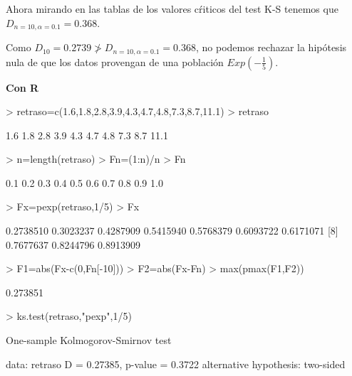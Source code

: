 \documentclass[10pt]{article}
\begin{document}
{Ahora mirando en las tablas de los valores cŕiticos del test K-S tenemos que $D_{n=10,\alpha=0.1}=0.368$.

Como  $D_{10}=0.2739\not> D_{n=10,\alpha=0.1}=0.368$, no podemos rechazar la hipótesis nula de que los datos provengan de una población $Exp(-\frac{1}{5}).$



\textbf{Con R}

\begin{Schunk}
\begin{Sinput}
> retraso=c(1.6,1.8,2.8,3.9,4.3,4.7,4.8,7.3,8.7,11.1)
> retraso
\end{Sinput}
\begin{Soutput}
 [1]  1.6  1.8  2.8  3.9  4.3  4.7  4.8  7.3  8.7 11.1
\end{Soutput}
\begin{Sinput}
> n=length(retraso)
> Fn=(1:n)/n
> Fn
\end{Sinput}
\begin{Soutput}
 [1] 0.1 0.2 0.3 0.4 0.5 0.6 0.7 0.8 0.9 1.0
\end{Soutput}
\begin{Sinput}
> Fx=pexp(retraso,1/5)
> Fx
\end{Sinput}
\begin{Soutput}
 [1] 0.2738510 0.3023237 0.4287909 0.5415940 0.5768379 0.6093722 0.6171071
 [8] 0.7677637 0.8244796 0.8913909
\end{Soutput}
\begin{Sinput}
> F1=abs(Fx-c(0,Fn[-10]))
> F2=abs(Fx-Fn)
> max(pmax(F1,F2))
\end{Sinput}
\begin{Soutput}
[1] 0.273851
\end{Soutput}
\begin{Sinput}
> ks.test(retraso,"pexp",1/5)
\end{Sinput}
\begin{Soutput}
	One-sample Kolmogorov-Smirnov test

data:  retraso
D = 0.27385, p-value = 0.3722
alternative hypothesis: two-sided
\end{Soutput}
\end{Schunk}




}
\fi
\end{document}
